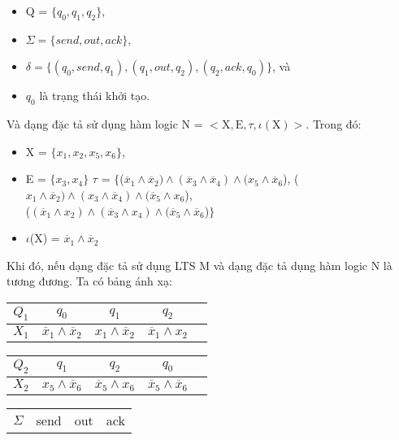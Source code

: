 \documentclass[a4paper,13pt,oneside,openany]{book}
\begin{document}
\begin{flushleft}
		\begin{itemize}
			\item Q = $\{q_0, q_1, q_2\}$,
			\item $\Sigma = \{send, out, ack\}$,
			\item $\delta = \{(q_0, send, q_1), (q_1, out, q_2), (q_2, ack, q_0)\}$, và
			\item $q_0$ là trạng thái khởi tạo.
		\end{itemize}
		Và dạng đặc tả sử dụng hàm logic N = $<\textrm{X}, \textrm{E}, \tau, \iota(\textrm{X})>$. Trong đó:\\
		\begin{itemize}
			\item X = $\{x_1, x_2, x_5, x_6\}$,
			\item E = $\{x_3, x_4\}$
			$\tau$ = $\{$($\overline{x}_1 \land \overline{x}_2) \land (\overline{x}_3 \land \overline{x}_4) \land (x_5 \land \overline{x}_6$), ($x_1\land\overline{x}_2)\land (x_3\land \overline{x}_4)\land (\overline{x}_5 \land x_6$),\\
			($(\overline{x}_1\land x_2)\land(\overline{x}_3\land x_4)\land (\overline{x}_5\land\overline{x}_6$)$\}$
			\item $\iota$(X) = $\overline{x}_1 \land \overline{x}_2$
		\end{itemize}
		Khi đó, nếu dạng đặc tả sử dụng LTS M và dạng đặc tả dụng hàm logic N là tương đương. Ta có bảng ánh xạ:
		\begin{table}[!ht]
			\centering
			\renewcommand{\arraystretch}{1.25}
			\begin{tabular}{|c|c|c|c|c|}
				\hline
				$Q_1$ & $q_0$ & $q_1$ & $q_2$\\
				\hline
				$X_1$ & $\overline{x}_1 \land \overline{x}_2$ & $x_1\land\overline{x}_2$&$\overline{x}_1\land x_2$\\
				\hline
			\end{tabular}
			\begin{tabular}{|c|c|c|c|c|}
				\hline
				$Q_2$ & $q_1$ & $q_2$ & $q_0$\\
				\hline
				$X_2$ & $x_5 \land \overline{x}_6$ & $\overline{x}_5 \land x_6$& $\overline{x}_5\land\overline{x}_6$\\
				\hline
			\end{tabular}
		\end{table}
		\begin{table}[!ht]
			\centering
			\renewcommand{\arraystretch}{1.25}
			\begin{tabular}{|c|c|c|c|}
				\hline
				$\Sigma$ & send & out & ack\\

\end{tabular}
\end{table}
\end{flushleft}
\end{document}
